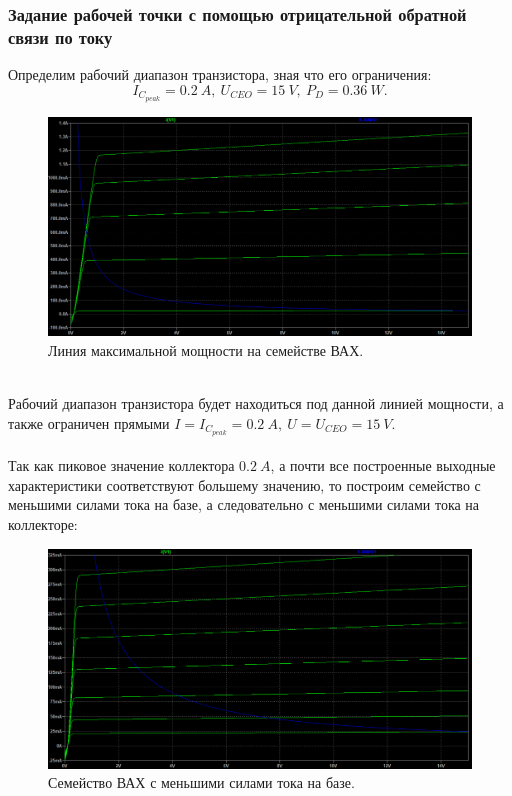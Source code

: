 \documentclass[12pt]{article}
\begin{document}
\subsubsection*{Задание рабочей точки с помощью отрицательной обратной связи по току}
Определим рабочий диапазон транзистора, зная что его ограничения:
\[
I_{C_{peak}} = 0.2 \ A, \ 
U_{CEO} = 15 \ V, \ 
P_D = 0.36 \ W.
\]
\begin{figure}[H]
    \centering
    \includegraphics[width=\textwidth]{3_output_char_w_max_p_line.png}
    \caption{Линия максимальной мощности на семействе ВАХ.}
    \label{fig:3_output_char_w_max_p_line.png}
\end{figure}
\ \\
Рабочий диапазон транзистора будет находиться под данной линией мощности, а также ограничен прямыми $I = I_{C_{peak}} = 0.2 \ A, \ U = U_{CEO} = 15 \ V.$ \\
\ \\
Так как пиковое значение коллектора $0.2 \ A$, а почти все построенные выходные характеристики соответствуют большему значению, то построим семейство с меньшими силами тока на базе, а следовательно с меньшими силами тока на коллекторе:
\begin{figure}[H]
    \centering
    \includegraphics[width=\textwidth]{3_small_output_char_w_max_p_line.png}
    \caption{Семейство ВАХ с меньшими силами тока на базе.}
    \label{fig:3_small_output_char_w_max_p_line.png}
\end{figure}
\end{document}
